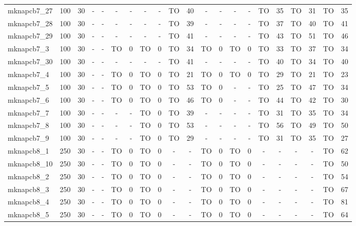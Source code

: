 \begin{sidewaystable}[!ht]
{\begin{tabular}{lcccccccccccccccccccc}
mknapcb7\_27 & 100 & 30 &  - &  - &  - &  - &  - &  - & TO & 40 &  - &  - &  - &  - & TO & 35 & TO & 31 & TO & 35 \\
mknapcb7\_28 & 100 & 30 &  - &  - &  - &  - &  - &  - & TO & 39 &  - &  - &  - &  - & TO & 37 & TO & 40 & TO & 41 \\
mknapcb7\_29 & 100 & 30 &  - &  - &  - &  - &  - &  - & TO & 41 &  - &  - &  - &  - & TO & 43 & TO & 51 & TO & 46 \\
mknapcb7\_3 & 100 & 30 &  - &  - & TO & 0 & TO & 0 & TO & 34 & TO & 0 & TO & 0 & TO & 33 & TO & 37 & TO & 34 \\
mknapcb7\_30 & 100 & 30 &  - &  - &  - &  - &  - &  - & TO & 41 &  - &  - &  - &  - & TO & 40 & TO & 34 & TO & 40 \\
mknapcb7\_4 & 100 & 30 &  - &  - & TO & 0 & TO & 0 & TO & 21 & TO & 0 & TO & 0 & TO & 29 & TO & 21 & TO & 23 \\
mknapcb7\_5 & 100 & 30 &  - &  - & TO & 0 & TO & 0 & TO & 53 & TO & 0 &  - &  - & TO & 25 & TO & 47 & TO & 34 \\
mknapcb7\_6 & 100 & 30 &  - &  - & TO & 0 & TO & 0 & TO & 46 & TO & 0 &  - &  - & TO & 44 & TO & 42 & TO & 30 \\
mknapcb7\_7 & 100 & 30 &  - &  - &  - &  - & TO & 0 & TO & 39 &  - &  - &  - &  - & TO & 31 & TO & 35 & TO & 34 \\
mknapcb7\_8 & 100 & 30 &  - &  - &  - &  - & TO & 0 & TO & 53 &  - &  - &  - &  - & TO & 56 & TO & 49 & TO & 50 \\
mknapcb7\_9 & 100 & 30 &  - &  - &  - &  - & TO & 0 & TO & 29 &  - &  - &  - &  - & TO & 31 & TO & 35 & TO & 27 \\
mknapcb8\_1 & 250 & 30 &  - &  - & TO & 0 & TO & 0 &  - &  - & TO & 0 & TO & 0 &  - &  - &  - &  - & TO & 62 \\
mknapcb8\_10 & 250 & 30 &  - &  - & TO & 0 & TO & 0 &  - &  - & TO & 0 & TO & 0 &  - &  - &  - &  - & TO & 50 \\
mknapcb8\_2 & 250 & 30 &  - &  - & TO & 0 & TO & 0 &  - &  - & TO & 0 & TO & 0 &  - &  - &  - &  - & TO & 54 \\
mknapcb8\_3 & 250 & 30 &  - &  - & TO & 0 & TO & 0 &  - &  - & TO & 0 & TO & 0 &  - &  - &  - &  - & TO & 67 \\
mknapcb8\_4 & 250 & 30 &  - &  - & TO & 0 & TO & 0 &  - &  - & TO & 0 & TO & 0 &  - &  - &  - &  - & TO & 81 \\
mknapcb8\_5 & 250 & 30 &  - &  - & TO & 0 & TO & 0 &  - &  - & TO & 0 & TO & 0 &  - &  - &  - &  - & TO & 64 \\

\end{tabular}}
\end{sidewaystable}
